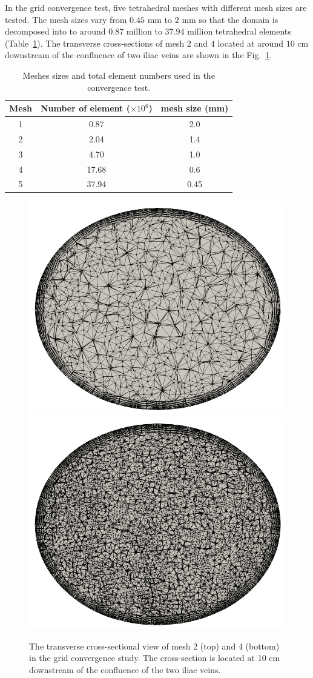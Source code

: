 In the grid convergence test, five tetrahedral meshes with different mesh sizes are tested. The mesh sizes vary from $0.45$ mm to $2$ mm so that the domain is decomposed into to around $0.87$ million to $37.94$ million tetrahedral elements (Table~\ref{tab:meshsize}). The transverse cross-sections of mesh $2$ and $4$ located at around $10$ cm downstream of the confluence of two iliac veins are shown in the Fig.~\ref{fig:IVCmesh}.

\begin{table}[h]
\caption {Meshes sizes and total element numbers used in the convergence test.} \label{tab:meshsize}
\centering
\begin{tabular}{|c|c|c|}
\hline
Mesh & Number of element ($\times10^6$)& mesh size (mm) \\ \hline
1    & 0.87              & 2.0              \\ \hline
2    & 2.04              & 1.4            \\ \hline
3    & 4.70              & 1.0               \\ \hline
4    & 17.68             & 0.6            \\ \hline
5    & 37.94             & 0.45            \\ \hline
\end{tabular}
\end{table}

\begin{figure}[h]\centering
    \includegraphics[width=0.5\linewidth]{imgs/vena_cava/mesh2_fixed.png}
    \includegraphics[width=0.5\linewidth]{imgs/vena_cava/mesh4.png}
    \caption{The transverse cross-sectional view of mesh 2 (top) and 4 (bottom) in the grid convergence study. The cross-section is located at 10 cm downstream of the confluence of the two iliac veins.}
    \label{fig:IVCmesh}
\end{figure}

